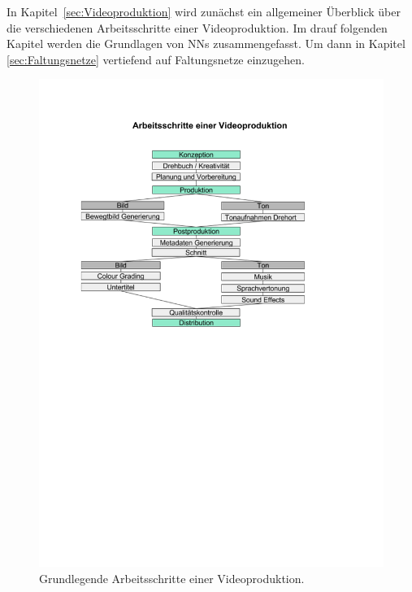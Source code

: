 \documentclass[times, 12pt,twocolumn]{article}
\begin{document}
 \label{sec:Grundlagen}
In Kapitel~\ref{sec:Videoproduktion} wird zunächst ein allgemeiner Überblick über die verschiedenen Arbeitsschritte einer Videoproduktion. Im drauf folgenden Kapitel werden die Grundlagen von NNs zusammengefasst. Um dann in Kapitel \ref{sec:Faltungsnetze} vertiefend auf Faltungsnetze einzugehen. 
 \label{sec:Videoproduktion}
\begin{figure}
	\flushleft
	\includegraphics[width=\columnwidth, trim = 20mm 145mm 45mm 40mm, clip]{Bilder/ArbeitsschritteVideoproduktion.pdf}
	\caption{Grundlegende Arbeitsschritte einer Videoproduktion.}
	\label{fig:Videoproduktion}
\end{figure}
 \label{sec:NeuronaleNetze}
\end{document}
